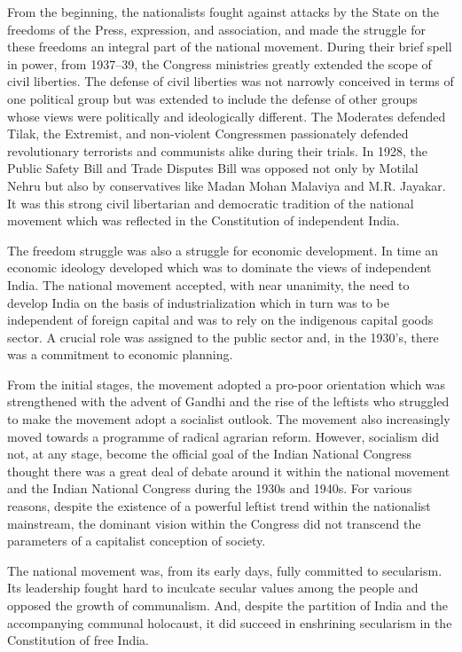 From the beginning, the nationalists fought against attacks by the State on the freedoms of the Press, expression, and association, and made the struggle for these freedoms an integral part of the national movement. During their brief spell in power, from 1937--39, the Congress ministries greatly extended the scope of civil liberties. The defense of civil liberties was not narrowly conceived in terms of one political group but was extended to include the defense of other groups whose views were politically and ideologically different. The Moderates defended Tilak, the Extremist, and non-violent Congressmen passionately defended revolutionary terrorists and communists alike during their trials. In 1928, the Public Safety Bill and Trade Disputes Bill was opposed not only by Motilal Nehru but also by conservatives like Madan Mohan Malaviya and M.R. Jayakar. It was this strong civil libertarian and democratic tradition of the national movement which was reflected in the Constitution of independent India.

The freedom struggle was also a struggle for economic development. In time an economic ideology developed which was to dominate the views of independent India. The national movement accepted, with near unanimity, the need to develop India on the basis of industrialization which in turn was to be independent of foreign capital and was to rely on the indigenous capital goods sector. A crucial role was assigned to the public sector and, in the 1930's, there was a commitment to economic planning.

From the initial stages, the movement adopted a pro-poor orientation which was strengthened with the advent of Gandhi and the rise of the leftists who struggled to make the movement adopt a socialist outlook. The movement also increasingly moved towards a programme of radical agrarian reform. However, socialism did not, at any stage, become the official goal of the Indian National Congress thought there was a great deal of debate around it within the national movement and the Indian National Congress during the 1930s and 1940s. For various reasons, despite the existence of a powerful leftist trend within the nationalist mainstream, the dominant vision within the Congress did not transcend the parameters of a capitalist conception of society.

The national movement was, from its early days, fully committed to secularism. Its leadership fought hard to inculcate secular values among the people and opposed the growth of communalism. And, despite the partition of India and the accompanying communal holocaust, it did succeed in enshrining secularism in the Constitution of free India.

